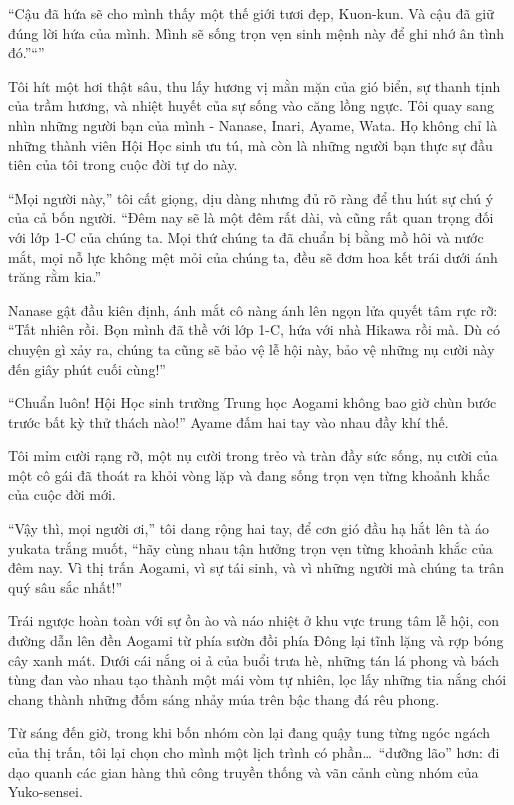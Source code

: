 \documentclass[../main.tex]{subfiles}
\begin{document}
``Cậu đã hứa sẽ cho mình thấy một thế giới tươi đẹp, Kuon-kun. Và cậu đã giữ đúng lời hứa của mình. Mình sẽ sống trọn vẹn sinh mệnh này để ghi nhớ ân tình đó.''``''

Tôi hít một hơi thật sâu, thu lấy hương vị mằn mặn của gió biển, sự thanh tịnh của trầm hương, và nhiệt huyết của sự sống vào căng lồng ngực. Tôi quay sang nhìn những người bạn của mình - Nanase, Inari, Ayame, Wata. Họ không chỉ là những thành viên Hội Học sinh ưu tú, mà còn là những người bạn thực sự đầu tiên của tôi trong cuộc đời tự do này.

``Mọi người này,'' tôi cất giọng, dịu dàng nhưng đủ rõ ràng để thu hút sự chú ý của cả bốn người. ``Đêm nay sẽ là một đêm rất dài, và cũng rất quan trọng đối với lớp 1-C của chúng ta. Mọi thứ chúng ta đã chuẩn bị bằng mồ hôi và nước mắt, mọi nỗ lực không mệt mỏi của chúng ta, đều sẽ đơm hoa kết trái dưới ánh trăng rằm kia.''

Nanase gật đầu kiên định, ánh mắt cô nàng ánh lên ngọn lửa quyết tâm rực rỡ: ``Tất nhiên rồi. Bọn mình đã thề với lớp 1-C, hứa với nhà Hikawa rồi mà. Dù có chuyện gì xảy ra, chúng ta cũng sẽ bảo vệ lễ hội này, bảo vệ những nụ cười này đến giây phút cuối cùng!''

``Chuẩn luôn! Hội Học sinh trường Trung học Aogami không bao giờ chùn bước trước bất kỳ thử thách nào!'' Ayame đấm hai tay vào nhau đầy khí thế.

Tôi mỉm cười rạng rỡ, một nụ cười trong trẻo và tràn đầy sức sống, nụ cười của một cô gái đã thoát ra khỏi vòng lặp và đang sống trọn vẹn từng khoảnh khắc của cuộc đời mới.

``Vậy thì, mọi người ơi,'' tôi dang rộng hai tay, để cơn gió đầu hạ hắt lên tà áo yukata trắng muốt, ``hãy cùng nhau tận hưởng trọn vẹn từng khoảnh khắc của đêm nay. Vì thị trấn Aogami, vì sự tái sinh, và vì những người mà chúng ta trân quý sâu sắc nhất!''


Trái ngược hoàn toàn với sự ồn ào và náo nhiệt ở khu vực trung tâm lễ hội, con đường dẫn lên đền Aogami từ phía sườn đồi phía Đông lại tĩnh lặng và rợp bóng cây xanh mát. Dưới cái nắng oi ả của buổi trưa hè, những tán lá phong và bách tùng đan vào nhau tạo thành một mái vòm tự nhiên, lọc lấy những tia nắng chói chang thành những đốm sáng nhảy múa trên bậc thang đá rêu phong.

Từ sáng đến giờ, trong khi bốn nhóm còn lại đang quậy tung từng ngóc ngách của thị trấn, tôi lại chọn cho mình một lịch trình có phần\dots\ ``dưỡng lão'' hơn: đi dạo quanh các gian hàng thủ công truyền thống và vãn cảnh cùng nhóm của Yuko-sensei.
\end{document}
